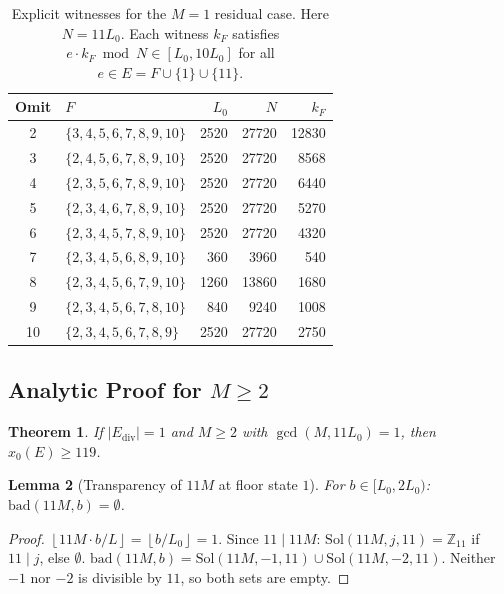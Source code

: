 \documentclass[11pt]{article}
\newtheorem{theorem}{Theorem}[section]
\newtheorem{lemma}[theorem]{Lemma}
\theoremstyle{definition}
\newcommand{\Ediv}{E_{\mathrm{div}}}
\newcommand{\bad}{\mathrm{bad}}
\newcommand{\Sol}{\mathrm{Sol}}
\newcommand{\floor}[1]{\left\lfloor #1 \right\rfloor}
\begin{document}
\begin{table}[h]
  \centering
  \caption{Explicit witnesses for the $M = 1$ residual case.
    Here $N = 11 L_0$.
    Each witness $k_F$ satisfies $e \cdot k_F \bmod N \in [L_0, 10L_0]$
    for all $e \in E = F \cup \{1\} \cup \{11\}$.}
  \label{tab:witnesses}
  \begin{tabular}{clrrr}
    \toprule
    Omit & $F$ & $L_0$ & $N$ & $k_F$ \\
    \midrule
    2  & $\{3,4,5,6,7,8,9,10\}$ & 2520 & 27720 & 12830 \\
    3  & $\{2,4,5,6,7,8,9,10\}$ & 2520 & 27720 & 8568  \\
    4  & $\{2,3,5,6,7,8,9,10\}$ & 2520 & 27720 & 6440  \\
    5  & $\{2,3,4,6,7,8,9,10\}$ & 2520 & 27720 & 5270  \\
    6  & $\{2,3,4,5,7,8,9,10\}$ & 2520 & 27720 & 4320  \\
    7  & $\{2,3,4,5,6,8,9,10\}$ & 360  & 3960  & 540   \\
    8  & $\{2,3,4,5,6,7,9,10\}$ & 1260 & 13860 & 1680  \\
    9  & $\{2,3,4,5,6,7,8,10\}$ & 840  & 9240  & 1008  \\
    10 & $\{2,3,4,5,6,7,8,9\}$  & 2520 & 27720 & 2750  \\
    \bottomrule
  \end{tabular}
\end{table}

\subsection{Analytic Proof for $M \geq 2$}
\label{sec:largem}

\begin{theorem}
  \label{thm:largem}
  If $|\Ediv| = 1$ and $M \geq 2$ with $\gcd(M, 11 L_0) = 1$, then
  $x_0(E) \geq 119$.
\end{theorem}

\begin{lemma}[Transparency of $11M$ at floor state $1$]
  \label{lem:transparencyB}
  For $b \in [L_0, 2L_0)$: $\bad(11M, b) = \emptyset$.
\end{lemma}

\begin{proof}
  $\floor{11M \cdot b / L} = \floor{b / L_0} = 1$.
  Since $11 \mid 11M$: $\Sol(11M, j, 11) = \mathbb{Z}_{11}$ if
  $11 \mid j$, else $\emptyset$.
  $\bad(11M, b) = \Sol(11M, -1, 11) \cup \Sol(11M, -2, 11)$.
  Neither $-1$ nor $-2$ is divisible by $11$, so both sets are empty.
\end{proof}
\end{document}
